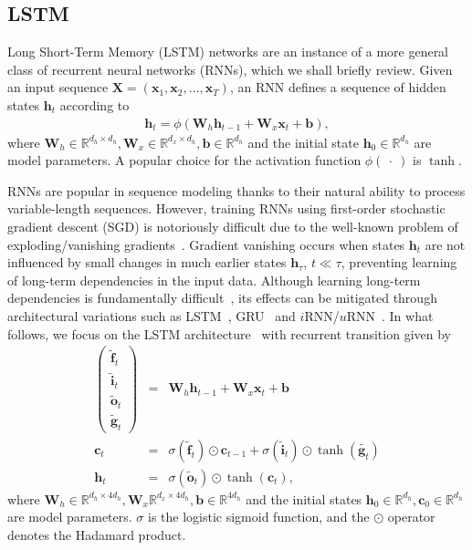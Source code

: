 \documentclass{article} %
\newcommand{\vect}[1]{\mathbf{#1}}
\newcommand{\mat}[1]{\mathbf{#1}}
\newcommand{\ewprod}{\odot}
\newcommand{\reals}{\mathbb{R}}
\begin{document}
\subsection{LSTM}

Long Short-Term Memory (LSTM) networks are an instance of a more general class of recurrent neural networks (RNNs),
which we shall briefly review.
Given an input sequence $\mat{X} = ( \vect{x}_1, \vect{x}_2, \ldots, \vect{x}_T )$,
an RNN defines a sequence of hidden states $\vect{h}_t$ according to
\begin{eqnarray}
  \vect{h}_t = \phi(\mat{W}_h \vect{h}_{t-1} + \mat{W}_x  \vect{x}_t + \vect{b}),
\end{eqnarray}
where $\mat{W}_h \in \reals^{d_h \times d_h}, \mat{W}_x \in \reals^{d_x \times d_h}, \vect{b} \in \reals^{d_h}$
and the initial state $\vect{h}_0 \in \reals^{d_h}$ %
are model parameters.
A popular choice for the activation function $\phi(\ \cdot\ )$ is $\tanh$.

RNNs are popular in sequence modeling thanks to their natural ability to process variable-length sequences.
However, training RNNs using first-order stochastic gradient descent (SGD) is notoriously difficult
due to the well-known problem of exploding/vanishing gradients~\cite{bengio1994learning,hochreiter1991untersuchungen,pascanudifficulty}.
Gradient vanishing occurs when states $\vect{h}_t$ are not influenced by small changes in much earlier states $\vect{h}_{\tau}$, $t \ll \tau$,
preventing learning of long-term dependencies in the input data.
Although learning long-term dependencies is fundamentally difficult~\cite{bengio1994learning},
its effects can be mitigated through architectural variations such as LSTM~\cite{lstm}, GRU~\cite{cho2014learning} and $i$RNN/$u$RNN~\cite{le2015simple,urnn}.
In what follows, we focus on the LSTM architecture~\cite{lstm} with recurrent transition given by
\begin{eqnarray}
\left(\begin{array}{ccc}
\tilde{\vect{f}}_t \\
\tilde{\vect{i}}_t \\
\tilde{\vect{o}}_t \\
\tilde{\vect{g}}_t
\end{array}\right)
 &=&
 \mat{W}_h \vect{h}_{t-1} +
 \mat{W}_x \vect{x}_t +
 \vect{b}
 \\
\vect{c}_t &= &\sigma(\tilde{\vect{f}}_t) \ewprod \vect{c}_{t-1} +
\sigma(\tilde{\vect{i}}_t) \ewprod \tanh(\tilde{\vect{g}_t}) \\
\vect{h}_t &= &\sigma(\tilde{\vect{o}}_t) \ewprod \tanh(\vect{c}_t),
\end{eqnarray}
where $\vect{W}_h \in \reals^{d_h \times 4 d_h}, \vect{W}_x \reals^{d_x \times 4 d_h}, \vect{b} \in \reals^{4 d_h}$
and the initial states $\vect{h}_0 \in \reals^{d_h}, \vect{c}_0 \in \reals^{d_h}$ %
are model parameters.
$\sigma$ is the logistic sigmoid function, and the $\ewprod$ operator denotes the Hadamard product.
\end{document}
